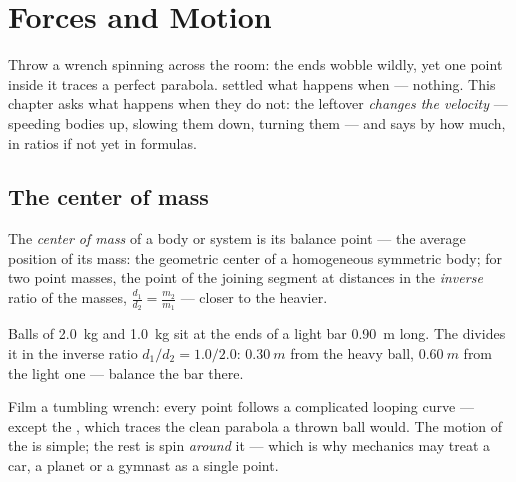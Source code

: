 \chapter{Forces and Motion}\label{ch:g11:forces-and-motion}

Throw a wrench spinning across the room: the ends wobble wildly, yet
one point inside it traces a perfect parabola. 
settled what happens when   --- nothing. This chapter
asks what happens when they do not: the leftover  \emph{changes
the velocity} --- speeding bodies up, slowing them down, turning them
--- and says by how much, in ratios if not yet in formulas.

\section{The center of mass}

\begin{definition}\label{def:g11:forces-and-motion:com}
The \emph{center of mass} of a body or system is
its balance point --- the average position of its mass: the geometric
center of a homogeneous symmetric body; for two point masses, the point
of the joining segment at distances in the \emph{inverse} ratio of the
masses, $\frac{d_1}{d_2} = \frac{m_2}{m_1}$ --- closer to the heavier.
\end{definition}

\begin{example}\label{ex:g11:forces-and-motion:dumbbell}
Balls of \qty{2.0}{kg} and \qty{1.0}{kg} sit at the ends of a light bar
\qty{0.90}{m} long. The  divides it in the inverse ratio
$d_1/d_2 = 1.0/2.0$: $\qty{0.30}{m}$ from the heavy ball,
$\qty{0.60}{m}$ from the light one --- balance the bar there.
\end{example}

\begin{remark}\label{rem:g11:forces-and-motion:wrench}
Film a tumbling wrench: every point follows a complicated looping curve
--- except the , which traces the clean parabola a thrown
ball would. The motion of the  is simple; the rest is spin
\emph{around} it --- which is why mechanics may treat a car, a planet or
a gymnast as a single point.
\end{remark}

